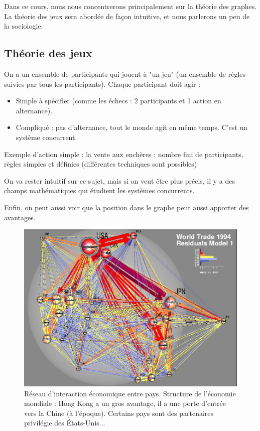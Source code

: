 Dans ce cours, nous nous concentrerons principalement sur la théorie des graphes. La théorie des jeux sera abordée de façon intuitive, et nous parlerons un peu de la sociologie.

\subsection{Théorie des jeux}
On a un ensemble de participants qui jouent à "un jeu" (un ensemble de règles suivies par tous les participants). Chaque participant doit agir : 

\begin{itemize}
\item Simple à spécifier (comme les échecs : 2 participants et 1 action en alternance). 
\item Compliqué : pas d'alternance, tout le monde agit en même temps. C'est un système concurrent.
\end{itemize}

Exemple d'action simple : la vente aux enchères : 
	nombre fini de participants,
	règles simples et définies (différentes techniques sont possibles)
	
\vspace{1cm}

On va rester intuitif sur ce sujet, mais si on veut être plus précis, il y a des champs mathématiques qui étudient les systèmes concurrents.

Enfin, on peut aussi voir que la position dans le graphe peut aussi apporter des avantages.

\begin{figure}[!ht]
\centering
\includegraphics[width=0.8\linewidth]{images/network_international_trade.png}
\caption{Réseau d'interaction économique entre pays. Structure de
    l'économie mondiale : Hong Kong a un gros avantage, il a une porte
    d'entrée vers la Chine (à l'époque). Certains pays sont des
partenaires privilégie des États-Unis...}
\end{figure}

